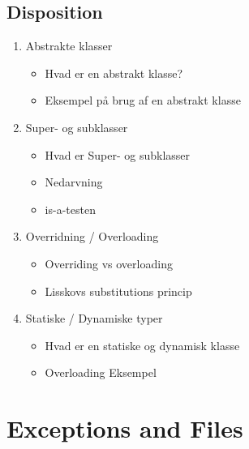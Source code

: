 \documentclass{article}
\begin{document}
\subsection{Disposition}
\begin{enumerate}
	\item Abstrakte klasser
	\begin{itemize}
		\item Hvad er en abstrakt klasse?
		\item Eksempel på brug af en abstrakt klasse
	\end{itemize}
	\item Super- og subklasser 
	\begin{itemize}
		\item Hvad er Super- og subklasser
		\item Nedarvning
		\item is-a-testen
	\end{itemize}
	\item Overridning / Overloading
	\begin{itemize}
		\item Overriding vs overloading
		\item Lisskovs substitutions princip
	\end{itemize}
	\item Statiske / Dynamiske typer 
	\begin{itemize}
		\item Hvad er en statiske og dynamisk klasse
		\item Overloading Eksempel
	\end{itemize}
	
\end{enumerate}
\newpage

\section{Exceptions and Files}
\end{document}
